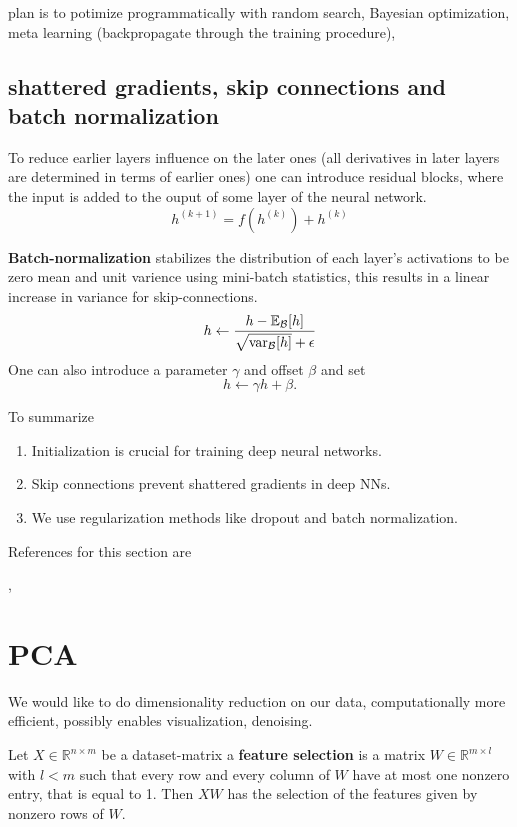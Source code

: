 \documentclass[12 pt]{article}        	%
\begin{document}
plan is to potimize programmatically with random search, Bayesian optimization, meta learning (backpropagate through the training procedure),

\subsection{shattered gradients, skip connections and batch normalization}

To reduce earlier layers influence on the later ones (all derivatives in later layers are determined in terms of earlier ones) one can introduce residual blocks, where the input is added to the ouput of some layer of the neural network.
\[
    h^{ ( k + 1 ) } = f ( h^{ ( k ) } ) + h^{ ( k ) } 
\]

\textbf{Batch-normalization} stabilizes the distribution of each layer's activations to be zero mean and unit varience using mini-batch statistics, this results in a linear increase in variance for skip-connections.
\[
    h \leftarrow \frac{ h - \mathbb{ E }_{ \mathcal{ B } } [ h ] }{ \sqrt{ \operatorname{var}_{ \mathcal{ B } } [ h ] } + \epsilon }
\]
One can also introduce a parameter $ \gamma $ and offset $ \beta $ and
set
\[
    h \leftarrow \gamma h + \beta. 
\]

To summarize
\begin{enumerate}
    \item 
    Initialization is crucial for training deep neural networks.

    \item 
    Skip connections prevent shattered gradients in deep NNs.

    \item 
    We use regularization methods like dropout and batch normalization.
\end{enumerate}

References for this section are
\begin{center}
    \cite[ch.7,11]{prince2023understanding},\cite[ch.7,11]{Goodfellow-et-al-2016}
\end{center}

\section{PCA}

We would like to do dimensionality reduction on our data, computationally more efficient, possibly enables visualization, denoising.

\begin{defi}
    Let $ X \in \mathbb{ R }^{ n \times m } $ be a dataset-matrix a \textbf{feature selection} is a matrix $ W \in \mathbb{ R }^{ m \times l } $ with $ l < m $ such that every row and every column of $ W $ have at most one nonzero entry, that is equal to 1.
    Then $ X W $ has the selection of the features given by nonzero rows of $ W $.  
\end{defi}
\end{document}
